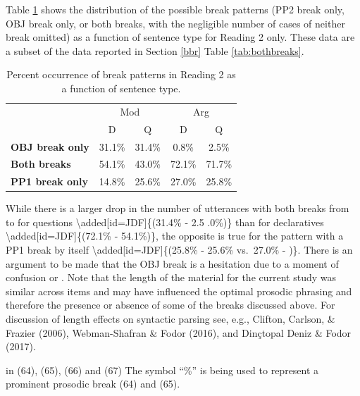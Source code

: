 \documentclass[12pt,oneside]{book}
\begin{document}
Table \ref{tab:combobr} shows the distribution of the possible  break patterns (PP2 break only, OBJ break only, or both breaks, with the negligible number of cases of neither break omitted) as a function of sentence type for Reading 2 only. These data are a subset of the data reported in Section \ref{bbr} Table \ref{tab:bothbreaks}.

\begin{table}[!h]

\caption{\label{tab:combobr}Percent occurrence of break patterns in Reading 2 as a function of sentence type.}
\centering
\begin{tabular}{>{\bfseries}lcccc}
\toprule
\multicolumn{1}{c}{ } & \multicolumn{2}{c}{Mod} & \multicolumn{2}{c}{Arg} \\
\cmidrule(l{3pt}r{3pt}){2-3} \cmidrule(l{3pt}r{3pt}){4-5}
  & D & Q & D & Q\\
\midrule
OBJ break only & 31.1\% & 31.4\% & 0.8\% & 2.5\%\\
Both breaks & 54.1\% & 43.0\% & 72.1\% & 71.7\%\\
PP1 break only & 14.8\% & 25.6\% & 27.0\% & 25.8\%\\
\bottomrule
\end{tabular}
\end{table}

While there is a larger drop in the number of utterances with both breaks from  to  for questions \textbackslash{}added{[}id=JDF{]}\{(31.4\% - 2.5 .0\%)\} than for declaratives \textbackslash{}added{[}id=JDF{]}\{(72.1\% - 54.1\%)\}, the opposite is true for the pattern with a PP1 break by itself \textbackslash{}added{[}id=JDF{]}\{(25.8\% - 25.6\% vs.~27.0\% - )\}. There is an argument to be made that the OBJ break is  a hesitation  due to a moment of confusion or . Note that the length of the material for the current study was similar across items and may have influenced the optimal prosodic phrasing and therefore the presence or absence of some of the breaks discussed above. For discussion of length effects on syntactic parsing see, e.g., Clifton, Carlson, \& Frazier (2006), Webman-Shafran \& Fodor (2016), and Dinçtopal Deniz \& Fodor (2017).

 in (64), (65), (66) and (67)  The symbol ``\%'' is being used to represent a prominent prosodic break  (64) and (65).
\end{document}
